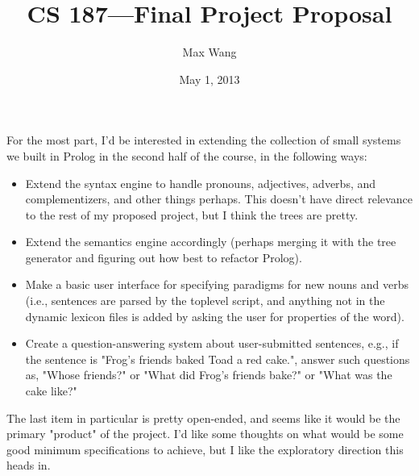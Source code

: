 \documentclass[11pt]{article}
\title{CS 187---Final Project Proposal}
\author{Max Wang}
\date{May 1, 2013}
\begin{document}
\maketitle

For the most part, I'd be interested in extending the collection of small
systems we built in Prolog in the second half of the course, in the following
ways:

\begin{itemize}
  \item Extend the syntax engine to handle pronouns, adjectives, adverbs, and
    complementizers, and other things perhaps. This doesn't have direct
    relevance to the rest of my proposed project, but I think the trees are
    pretty.
  \item Extend the semantics engine accordingly (perhaps merging it with the
    tree generator and figuring out how best to refactor Prolog).
  \item Make a basic user interface for specifying paradigms for new nouns and
    verbs (i.e., sentences are parsed by the toplevel script, and anything not
    in the dynamic lexicon files is added by asking the user for properties of
    the word).
  \item Create a question-answering system about user-submitted sentences,
    e.g., if the sentence is "Frog's friends baked Toad a red cake.", answer
    such questions as, "Whose friends?" or "What did Frog's friends bake?" or
    "What was the cake like?"
\end{itemize}

The last item in particular is pretty open-ended, and seems like it would be
the primary "product" of the project. I'd like some thoughts on what would be
some good minimum specifications to achieve, but I like the exploratory
direction this heads in.
\end{document}
